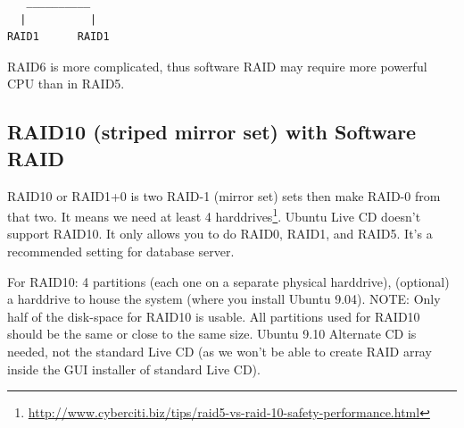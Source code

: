 \begin{verbatim}
   __________
  |          |
RAID1      RAID1
\end{verbatim}

RAID6 is more complicated, thus software RAID may require more powerful CPU than
in RAID5.



\subsection{RAID10 (striped mirror set) with Software RAID}
\label{sec:RAID10}

RAID10 or RAID1+0 is two RAID-1 (mirror set) sets then make RAID-0 from that
two.  It means we need at least 4
harddrives\footnote{\url{http://www.cyberciti.biz/tips/raid5-vs-raid-10-safety-performance.html}}.
Ubuntu Live CD doesn't support RAID10. It only allows you to do RAID0, RAID1,
and RAID5. It's a recommended setting for database server. 

For RAID10: 4 partitions (each one on a separate physical harddrive), (optional)
a harddrive to house the system (where you install Ubuntu 9.04).
NOTE: Only half of the disk-space for RAID10 is usable. All partitions used for
RAID10 should be the same or close to the same size. Ubuntu 9.10 Alternate CD is
needed, not the standard Live CD (as we won't be able to create RAID array
inside the GUI installer of standard Live CD). 

